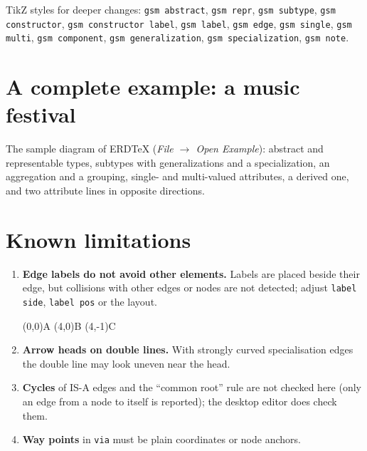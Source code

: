 \documentclass[10pt,a4paper]{article}
\begin{document}
{\raggedright TikZ styles for deeper changes: \texttt{gsm abstract}, \texttt{gsm repr},
\texttt{gsm subtype}, \texttt{gsm constructor},
\texttt{gsm constructor label}, \texttt{gsm label}, \texttt{gsm edge},
\texttt{gsm single}, \texttt{gsm multi}, \texttt{gsm component},
\texttt{gsm generalization}, \texttt{gsm specialization},
\texttt{gsm note}.\par}

\section{A complete example: a music festival}

The sample diagram of ERDTeX (\emph{File $\to$ Open Example}): abstract and
representable types, subtypes with generalizations and a specialization, an
aggregation and a grouping, single- and multi-valued attributes, a derived one,
and two attribute lines in opposite directions.

\noindent{}



\section{Known limitations}

\begin{enumerate}
\item \textbf{Edge labels do not avoid other elements.} Labels are
  placed beside their edge, but collisions with other edges or nodes
  are not detected; adjust \texttt{label side}, \texttt{label pos} or
  the layout.
\begin{example}
\begin{gsmdiagram}
  (0,0){A}
  (4,0){B}
  (4,-1){C}
\end{gsmdiagram}
\end{example}
\item \textbf{Arrow heads on double lines.} With strongly curved
  specialisation edges the double line may look uneven near the head.
\item \textbf{Cycles} of IS-A edges and the ``common root'' rule are not
  checked here (only an edge from a node to itself is reported); the desktop editor does check them.
\item \textbf{Way points} in \texttt{via} must be plain coordinates or
  node anchors.
\end{enumerate}
\end{document}
